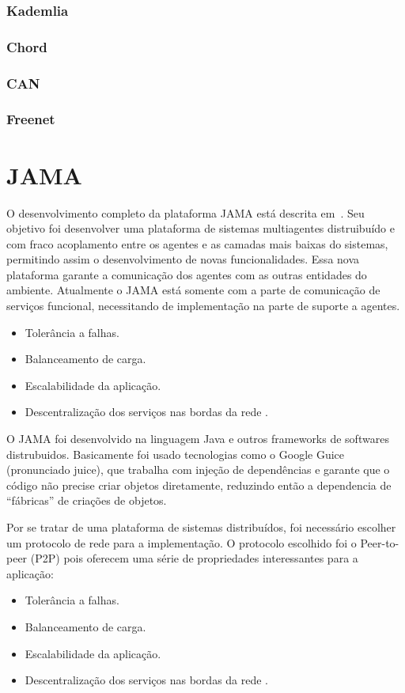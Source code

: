\subsubsection{Kademlia}

\subsubsection{Chord}

\subsubsection{CAN}

\subsubsection{Freenet}


\section{JAMA}

O desenvolvimento completo da plataforma JAMA está descrita em~\cite{parise11}. Seu objetivo foi desenvolver uma plataforma de sistemas multiagentes distruibuído e com fraco acoplamento entre os agentes e as camadas mais baixas do sistemas, permitindo assim o desenvolvimento de novas funcionalidades. Essa nova plataforma garante a comunicação dos agentes com as outras entidades do ambiente. Atualmente o JAMA está somente com a parte de comunicação de serviços funcional, necessitando de implementação na parte de suporte a agentes.
\begin{itemize}
	\item Tolerância a falhas.
	\item Balanceamento de carga.
	\item Escalabilidade da aplicação.
	\item Descentralização dos serviços nas bordas da rede	.
\end{itemize}


O JAMA foi desenvolvido na linguagem Java e outros frameworks de softwares distrubuidos. Basicamente foi usado tecnologias como o Google Guice (pronunciado juice), que trabalha com injeção de dependências e garante que o código não precise criar objetos diretamente, reduzindo então a dependencia de ``fábricas'' de criações de objetos.

Por se tratar de uma plataforma de sistemas distribuídos, foi necessário escolher um protocolo de rede para a implementação. O protocolo escolhido foi o Peer-to-peer (P2P) pois oferecem uma série de propriedades interessantes para a aplicação:
\begin{itemize}
	\item Tolerância a falhas.
	\item Balanceamento de carga.
	\item Escalabilidade da aplicação.
	\item Descentralização dos serviços nas bordas da rede	.
\end{itemize}

